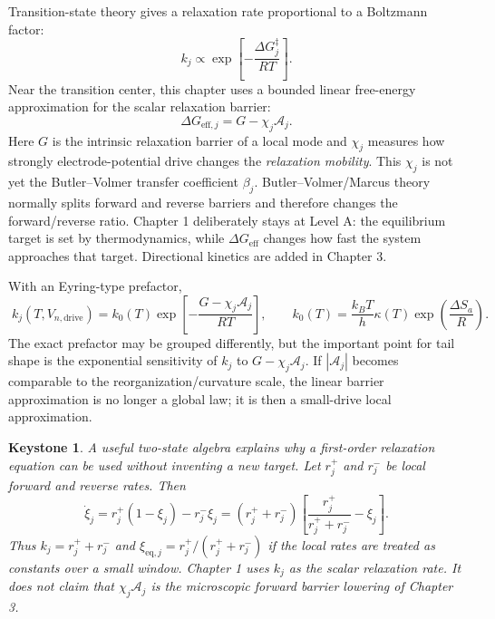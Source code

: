 \documentclass[11pt,a4paper]{article}
\newtheorem*{keybox}{Keystone}
\newcommand{\eff}{\mathrm{eff}}
\newcommand{\eq}{\mathrm{eq}}
\newcommand{\drive}{\mathrm{drive}}
\begin{document}
Transition-state theory gives a relaxation rate proportional to a Boltzmann factor:
\begin{equation}
k_j\propto \exp\left[-\frac{\Delta G_j^\ddagger}{RT}\right].
\end{equation}
Near the transition center, this chapter uses a bounded linear free-energy approximation for the scalar relaxation barrier:
\begin{equation}
\boxed{\;\Delta G_{\eff,j}=G-\chi_j\mathcal A_j.\;}
\label{eq:Geff}
\end{equation}
Here $G$ is the intrinsic relaxation barrier of a local mode and $\chi_j$ measures how strongly electrode-potential drive changes the
\emph{relaxation mobility}. This $\chi_j$ is not yet the Butler--Volmer transfer coefficient $\beta_j$. Butler--Volmer/Marcus theory normally
splits forward and reverse barriers and therefore changes the forward/reverse ratio. Chapter 1 deliberately stays at Level A: the equilibrium
target is set by thermodynamics, while $\Delta G_{\eff}$ changes how fast the system approaches that target. Directional kinetics are added in
Chapter 3.

With an Eyring-type prefactor,
\begin{equation}
\boxed{\;k_j(T,V_{n,\drive})=k_0(T)\exp\left[-\frac{G-\chi_j\mathcal A_j}{RT}\right],\qquad
k_0(T)=\frac{k_BT}{h}\kappa(T)\exp\left(\frac{\Delta S_a}{R}\right).\;}
\label{eq:kact}
\end{equation}
The exact prefactor may be grouped differently, but the important point for tail shape is the exponential sensitivity of $k_j$ to
$G-\chi_j\mathcal A_j$. If $|\mathcal A_j|$ becomes comparable to the reorganization/curvature scale, the linear barrier approximation is no
longer a global law; it is then a small-drive local approximation.

\begin{keybox}
A useful two-state algebra explains why a first-order relaxation equation can be used without inventing a new target. Let
$r_j^+$ and $r_j^-$ be local forward and reverse rates. Then
\begin{equation}
\dot\xi_j=r_j^+(1-\xi_j)-r_j^-\xi_j=(r_j^++r_j^-)
\left[\frac{r_j^+}{r_j^++r_j^-}-\xi_j\right].
\end{equation}
Thus $k_j=r_j^++r_j^-$ and $\xi_{\eq,j}=r_j^+/(r_j^++r_j^-)$ if the local rates are treated as constants over a small window. Chapter 1
uses $k_j$ as the scalar relaxation rate. It does not claim that $\chi_j\mathcal A_j$ is the microscopic forward barrier lowering of Chapter 3.
\end{keybox}
\end{document}
